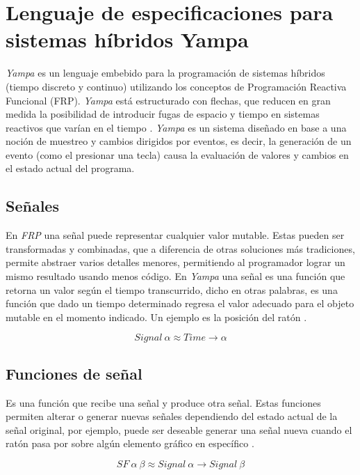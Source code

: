 \section{Lenguaje de especificaciones para sistemas híbridos Yampa}

\emph{Yampa} es un lenguaje embebido para la programación de sistemas híbridos (tiempo discreto y continuo) utilizando los conceptos de Programación Reactiva Funcional (FRP). \emph{Yampa} está estructurado con flechas, que reducen en gran medida la posibilidad de introducir fugas de espacio y tiempo en sistemas reactivos que varían en el tiempo \cite{wiki:Yampa}. \emph{Yampa} es un sistema diseñado en base a una noción de muestreo y cambios dirigidos por eventos, es decir, la generación de un evento (como el presionar una tecla) causa la evaluación de valores y cambios en el estado actual del programa.

\subsection{Señales}
En \emph{FRP} una señal puede representar cualquier valor mutable. Estas pueden ser transformadas y combinadas, que a diferencia de otras soluciones más tradiciones, permite abstraer varios detalles menores, permitiendo al programador lograr un mismo resultado usando menos código. En \emph{Yampa} una señal es una función que retorna un valor según el tiempo transcurrido, dicho en otras palabras, es una función que dado un tiempo determinado regresa el valor adecuado para el objeto mutable en el momento indicado. Un ejemplo es la posición del ratón \cite{wiki:Yampa} \cite{Courtney2003b}.

\begin{equation}
Signal \ \alpha \approx Time \rightarrow \alpha
\end{equation}

\subsection{Funciones de señal}
Es una función que recibe una señal y produce otra señal. Estas funciones permiten alterar o generar nuevas señales dependiendo del estado actual de la señal original, por ejemplo, puede ser deseable generar una señal nueva cuando el ratón pasa por sobre algún elemento gráfico en específico \cite{wiki:Yampa}.

\begin{equation}
SF \ \alpha \ \beta \approx Signal \ \alpha \rightarrow Signal \ \beta
\end{equation}

